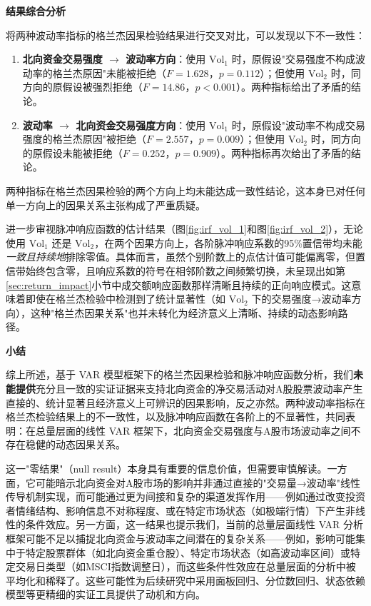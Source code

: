 \documentclass{article}
\begin{document}
\vspace{0.5em}
\noindent\textbf{结果综合分析}

将两种波动率指标的格兰杰因果检验结果进行交叉对比，可以发现以下不一致性：

\begin{enumerate}
    \item \textbf{北向资金交易强度 $\to$ 波动率方向}：使用 $\text{Vol}_1$ 时，原假设"交易强度不构成波动率的格兰杰原因"未能被拒绝（$F = 1.628$，$p = 0.112$）；但使用 $\text{Vol}_2$ 时，同方向的原假设被强烈拒绝（$F = 14.86$，$p < 0.001$）。两种指标给出了矛盾的结论。

    \item \textbf{波动率 $\to$ 北向资金交易强度方向}：使用 $\text{Vol}_1$ 时，原假设"波动率不构成交易强度的格兰杰原因"被拒绝（$F = 2.557$，$p = 0.009$）；但使用 $\text{Vol}_2$ 时，同方向的原假设未能被拒绝（$F = 0.252$，$p = 0.909$）。两种指标再次给出了矛盾的结论。
\end{enumerate}

两种指标在格兰杰因果检验的两个方向上均未能达成一致性结论，这本身已对任何单一方向上的因果关系主张构成了严重质疑。

进一步审视脉冲响应函数的估计结果（图\ref{fig:irf_vol_1}和图\ref{fig:irf_vol_2}），无论使用 $\text{Vol}_1$ 还是 $\text{Vol}_2$，在两个因果方向上，各阶脉冲响应系数的95\%置信带均未能\textit{一致且持续地}排除零值。具体而言，虽然个别阶数上的点估计值可能偏离零，但置信带始终包含零，且响应系数的符号在相邻阶数之间频繁切换，未呈现出如第\ref{sec:return_impact}小节中成交额响应函数那样清晰且持续的正向响应模式。这意味着即使在格兰杰检验中检测到了统计显著性（如 $\text{Vol}_2$ 下的交易强度→波动率方向），这种"格兰杰因果关系"也并未转化为经济意义上清晰、持续的动态影响路径。

\vspace{0.5em}
\noindent\textbf{小结}

综上所述，基于 VAR 模型框架下的格兰杰因果检验和脉冲响应函数分析，我们\textbf{未能提供}充分且一致的实证证据来支持北向资金的净交易活动对A股股票波动率产生直接的、统计显著且经济意义上可辨识的因果影响，反之亦然。两种波动率指标在格兰杰检验结果上的不一致性，以及脉冲响应函数在各阶上的不显著性，共同表明：在总量层面的线性 VAR 框架下，北向资金交易强度与A股市场波动率之间不存在稳健的动态因果关系。

这一"零结果"（null result）本身具有重要的信息价值，但需要审慎解读。一方面，它可能暗示北向资金对A股市场的影响并非通过直接的"交易量→波动率"线性传导机制实现，而可能通过更为间接和复杂的渠道发挥作用——例如通过改变投资者情绪结构、影响信息不对称程度、或在特定市场状态（如极端行情）下产生非线性的条件效应。另一方面，这一结果也提示我们，当前的总量层面线性 VAR 分析框架可能不足以捕捉北向资金与波动率之间潜在的复杂关系——例如，影响可能集中于特定股票群体（如北向资金重仓股）、特定市场状态（如高波动率区间）或特定交易日类型（如MSCI指数调整日），而这些条件性效应在总量层面的分析中被平均化和稀释了。这些可能性为后续研究中采用面板回归、分位数回归、状态依赖模型等更精细的实证工具提供了动机和方向。  
\end{document}
